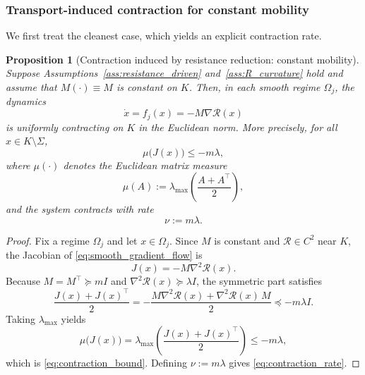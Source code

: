 \documentclass[12pt]{article}
\theoremstyle{plain}
\newtheorem{proposition}[theorem]{Proposition}
\theoremstyle{definition}
\theoremstyle{remark}
\begin{document}
\subsubsection*{Transport-induced contraction for constant mobility}

We first treat the cleanest case, which yields an explicit contraction
rate.

\begin{proposition}[Contraction induced by resistance reduction: constant mobility]
\label{prop:transport_contraction}
Suppose Assumptions~\ref{ass:resistance_driven} and~\ref{ass:R_curvature}
hold and assume that $M(\cdot)\equiv M$ is constant on $K$.
Then, in each smooth regime $\Omega_j$, the dynamics
\begin{equation}
\dot x = f_j(x)= -M\nabla \mathcal R(x)
\label{eq:smooth_gradient_flow}
\end{equation}
is uniformly contracting on $K$ in the Euclidean norm.
More precisely, for all $x\in K\setminus\Sigma$,
\begin{equation}
\mu\!\big(J(x)\big)\le -m\lambda,
\label{eq:contraction_bound}
\end{equation}
where $\mu(\cdot)$ denotes the Euclidean matrix measure
\begin{equation}
\mu(A):=\lambda_{\max}\!\left(\frac{A+A^\top}{2}\right),
\label{eq:matrix_measure_def}
\end{equation}
and the system contracts with rate
\begin{equation}
\nu := m\lambda .
\label{eq:contraction_rate}
\end{equation}
\end{proposition}

\begin{proof}
Fix a regime $\Omega_j$ and let $x\in\Omega_j$.
Since $M$ is constant and $\mathcal R\in C^2$ near $K$, the Jacobian of
\eqref{eq:smooth_gradient_flow} is
\[
J(x)= -M\nabla^2\mathcal R(x).
\]
Because $M=M^\top\succeq mI$ and $\nabla^2\mathcal R(x)\succeq \lambda I$,
the symmetric part satisfies
\[
\frac{J(x)+J(x)^\top}{2}
=
-\frac{M\nabla^2\mathcal R(x)+\nabla^2\mathcal R(x)\,M}{2}
\preceq -m\lambda I.
\]
Taking $\lambda_{\max}$ yields
\[
\mu\!\big(J(x)\big)
=
\lambda_{\max}\!\left(\frac{J(x)+J(x)^\top}{2}\right)
\le -m\lambda,
\]
which is \eqref{eq:contraction_bound}. Defining $\nu:=m\lambda$ gives
\eqref{eq:contraction_rate}.
\end{proof}
\end{document}
